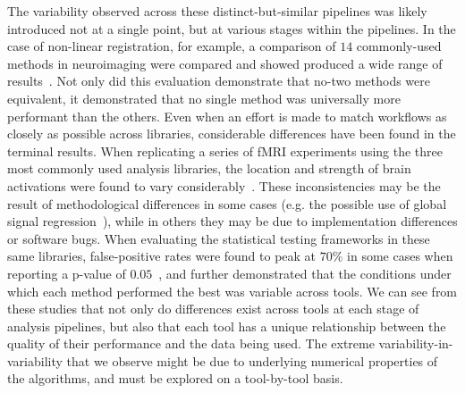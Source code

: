The variability observed across these distinct-but-similar pipelines was likely introduced not at a single point, but
at various stages within the pipelines. In the case of non-linear registration, for example, a comparison of $14$
commonly-used methods in neuroimaging were compared and showed produced a wide range of
results~\cite{klein2009evaluation}. Not only did this evaluation demonstrate that no-two methods were equivalent, it
demonstrated that no single method was universally more performant than the others. Even when an effort is made to
match workflows as closely as possible across libraries, considerable differences have been found in the terminal
results. When replicating a series of fMRI experiments using the three most commonly used analysis libraries, the
location and strength of brain activations were found to vary considerably~\cite{bowring2019exploring,bowringerratum}.
These inconsistencies may be the result of methodological differences in some cases (e.g. the possible use of global
signal regression~\cite{murphy2017towards}), while in others they may be due to implementation differences or software
bugs. When evaluating the statistical testing frameworks in these same libraries, false-positive rates were found to peak
at $70\%$ in some cases when reporting a p-value of $0.05$~\cite{eklund2016cluster}, and further demonstrated that the
conditions under which each method performed the best was variable across tools. We can see from these studies that not
only do differences exist across tools at each stage of analysis pipelines, but also that each tool has a unique
relationship between the quality of their performance and the data being used. The extreme variability-in-variability
that we observe might be due to underlying numerical properties of the algorithms, and must be explored on a
tool-by-tool basis.

